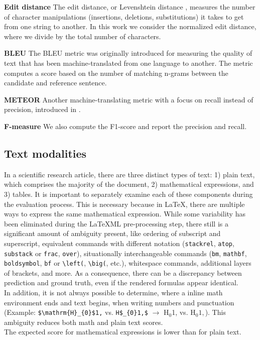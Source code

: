 \documentclass[]{article}
\newcommand{\para}[1]{\textbf{#1} \quad}
\begin{document}
\para{Edit distance}
The edit distance, or Levenshtein distance \cite{levenshtein_binary_1965}, measures the number of character manipulations (insertions, deletions, substitutions) it takes to get from one string to another. In this work we consider the normalized edit distance, where we divide by the total number of characters.

\para{BLEU}
The BLEU \cite{papineni_bleu_2002} metric was originally introduced for measuring the quality of text that has been machine-translated from one language to another. The metric computes a score based on the number of matching n-grams between the candidate and reference sentence.

\para{METEOR} Another machine-translating metric with a focus on recall instead of precision, introduced in \cite{banerjee_meteor_2005}.

\para{F-measure}
We also compute the F1-score and report the precision and recall.

\subsection{Text modalities}
In a scientific research article, there are three distinct types of text: 1) plain text, which comprises the majority of the document, 2) mathematical expressions, and 3) tables. It is important to separately examine each of these components during the evaluation process. This is necessary because in LaTeX, there are multiple ways to express the same mathematical expression. While some variability has been eliminated during the LaTeXML pre-processing step, there still is a significant amount of ambiguity present, like ordering of subscript and superscript, equivalent commands with different notation (\verb|stackrel|, \verb|atop|, \verb|substack| or \verb|frac|, \verb|over|), situationally interchangeable commands (\verb|bm|, \verb|mathbf|, \verb|boldsymbol|, \verb|bf| or \verb|\left(|, \verb|\big(|, etc.), whitespace commands, additional layers of brackets, and more. As a consequence, there can be a discrepancy between prediction and ground truth, even if the rendered formulas appear identical. \\
In addition, it is not always possible to determine, where a inline math environment ends and text begins, when writing numbers and punctuation (Example: \verb|$\mathrm{H}_{0}$1,| vs. \verb|H$_{0}1,$| $\to$ $\mathrm{H}_{0}$1, vs. H$_{0}1,$). This ambiguity reduces both math and plain text scores.\\
The expected score for mathematical expressions is lower than for plain text.
\end{document}
